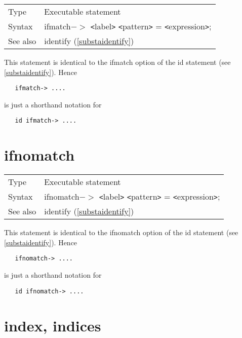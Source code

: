 \noindent \begin{tabular}{ll}
Type & Executable statement\\
Syntax & ifmatch$-\!\!>$ {\tt<}label{\tt>} {\tt<}pattern{\tt>} = {\tt<}expression{\tt>};
\\ See also & identify (\ref{substaidentify})
\end{tabular} \vspace{4mm}

\noindent This statement is identical to the ifmatch option 
of the id statement (see \ref{substaidentify}). Hence
\begin{verbatim}
   ifmatch-> ....
\end{verbatim}
is just a shorthand notation for
\begin{verbatim}
   id ifmatch-> ....
\end{verbatim}
\vspace{10mm}


\section{ifnomatch}
\label{substaifnomatch}

\noindent \begin{tabular}{ll}
Type & Executable statement\\
Syntax & ifnomatch$-\!\!>$ {\tt<}label{\tt>} {\tt<}pattern{\tt>} = {\tt<}expression{\tt>};
\\ See also & identify (\ref{substaidentify})
\end{tabular} \vspace{4mm}

\noindent This statement is identical to the ifnomatch option 
of the id statement (see \ref{substaidentify}). Hence
\begin{verbatim}
   ifnomatch-> ....
\end{verbatim}
is just a shorthand notation for
\begin{verbatim}
   id ifnomatch-> ....
\end{verbatim}
\vspace{10mm}

 
\section{index, indices}
\label{substaindex}

